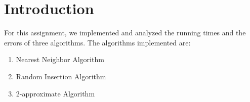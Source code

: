 \section{Introduction}\label{intro}
For this assignment, we implemented and analyzed the running times and the errors of three algorithms. The algorithms implemented are:
\begin{enumerate}
	\item Nearest Neighbor Algorithm
	\item Random Insertion Algorithm
	\item 2-approximate Algorithm
\end{enumerate}


\pagebreak

